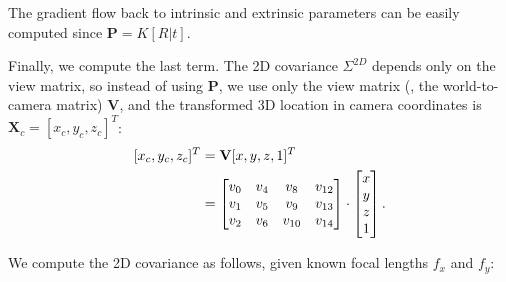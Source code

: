 The gradient flow back to intrinsic and extrinsic parameters can be easily computed since $\textbf{P}=K[R|t]$.

Finally, we compute the last term. The 2D covariance $\Sigma^{2D}$ depends only on the view matrix, so instead of using $\textbf{P}$, we use only the view matrix (\ie, the world-to-camera matrix) $\textbf{V}$, and the transformed 3D location in camera coordinates is $\textbf{X}_c=[x_c, y_c, z_c]^T$:
\begin{equation}
    \begin{aligned}
        \relax[x_c, y_c, z_c]^T&=\textbf{V}[x,y,z,1]^T\\
        &=\begin{bmatrix}
        v_{0} & v_{4} & v_{8} & v_{12}\\
        v_{1} & v_{5} & v_{9} & v_{13}\\
        v_{2} & v_{6} & v_{10} & v_{14}\\
        \end{bmatrix}
        \cdot\begin{bmatrix}
        x\\
        y\\
        z\\
        1
        \end{bmatrix}.
    \end{aligned}
\end{equation}


We compute the 2D covariance as follows, given known focal lengths $f_x$ and $f_y$:

